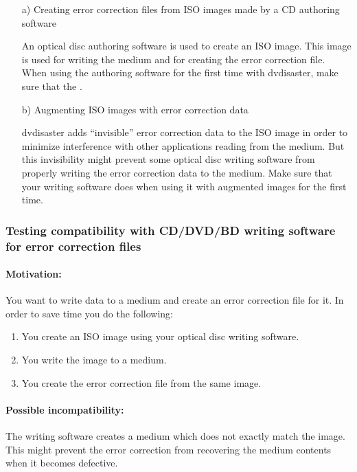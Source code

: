 \begin{itemize}
\item[a)] Creating error correction files from ISO images made by a CD authoring software

\smallskip

An optical disc authoring software is used to create an ISO image. This 
image is used for writing the medium and for creating the error correction file. 
When using the authoring software for the first time with dvdisaster, make sure 
that the .

\item[b)] Augmenting ISO images with error correction data

\smallskip

dvdisaster adds ``invisible'' error correction data to the ISO image
in  order to minimize interference with other applications reading from the medium.
But this invisibility might prevent some optical disc writing software from properly
writing the error correction data to the medium. Make sure that your 
writing software does 
when using it with augmented images for the first time.
\end{itemize}

\subsubsection{Testing compatibility with CD/DVD/BD writing software for error correction files}
\label{howto-compat-file}

\paragraph{Motivation:} You want to write data to a medium and create an error correction file for it.
In order to save time you do the following:

\begin{enumerate}
\item You create an ISO image using your optical disc writing software.
\item You write the image to a medium.
\item You create the error correction file from the same image.
\end{enumerate}

\newpage

\paragraph{Possible incompatibility:} The writing software creates a medium which
does not exactly match the image. This might prevent the error correction from recovering
the medium contents when it becomes defective. 

